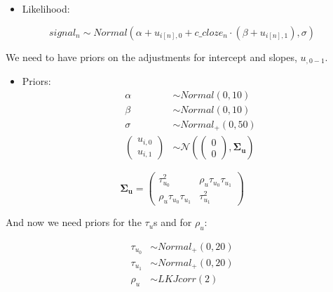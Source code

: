 \documentclass[12pt,ignorenonframetext,aspectratio=169]{beamer}
\providecommand{\tightlist}{%
  \setlength{\itemsep}{0pt}\setlength{\parskip}{0pt}}
\begin{document}
\begin{frame}

\begin{itemize}
\tightlist
\item
  Likelihood:
\end{itemize}

\begin{equation}
  signal_n \sim Normal(\alpha + u_{i[n],0} + c\_cloze_n \cdot  (\beta + u_{i[n],1}),\sigma)
  \end{equation}

We need to have priors on the adjustments for intercept and slopes, \(u_{,0-1}\).

\begin{itemize}
\tightlist
\item
  Priors:
  \begin{equation}
   \begin{aligned}
   \alpha & \sim Normal(0,10) \\
   \beta  & \sim Normal(0,10) \\
    \sigma  &\sim Normal_+(0,50)\\
    {\begin{pmatrix}
    u_{i,0} \\
    u_{i,1}
    \end{pmatrix}}
   &\sim {\mathcal {N}}
    \left(
   {\begin{pmatrix} 
    0\\
    0
   \end{pmatrix}}
   ,\boldsymbol{\Sigma_u} \right)
   \end{aligned}
   \end{equation}
\end{itemize}

\end{frame}

\begin{frame}

\begin{equation}
\boldsymbol{\Sigma_u} = 
{\begin{pmatrix} 
\tau_{u_0}^2 & \rho_u \tau_{u_0} \tau_{u_1} \\ 
\rho_u \tau_{u_0} \tau_{u_1} & \tau_{u_1}^2
\end{pmatrix}}
\end{equation}

\end{frame}

\begin{frame}

And now we need priors for the \(\tau_u\)s and for \(\rho_u\):

\begin{equation}
\begin{aligned}
\tau_{u_0} &\sim Normal_+(0,20)\\
\tau_{u_1} &\sim Normal_+(0,20)\\
\rho_u &\sim LKJcorr(2) 
\end{aligned}
\end{equation}

\end{frame}
\end{document}
